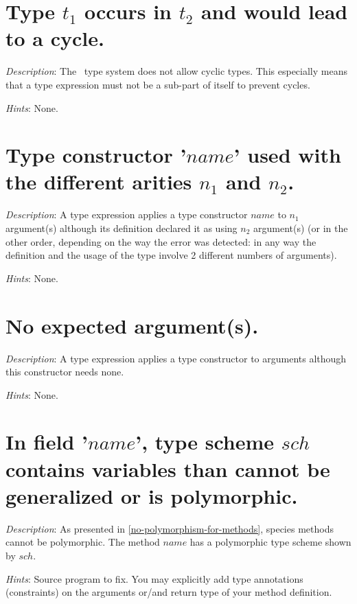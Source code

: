 \section*{Type $t_1$ occurs in $t_2$ and would lead to a cycle.}
{\em Description}: The \focal\ type system does not allow cyclic
types. This especially means that a type expression must not be a
sub-part of itself to prevent cycles.

{\em Hints}: None.



\section*{Type constructor '$name$' used with the different arities
  $n_1$ and $n_2$.}
{\em Description}: A type expression applies a type constructor $name$
to $n_1$ argument(s) although its definition declared it as using $n_2$
argument(s) (or in the other order, depending on the way the error was
detected: in any way the definition and the usage of the type involve
2 different numbers of arguments).

{\em Hints}: None.



\section*{No expected argument(s).}
{\em Description}: A type expression applies a type constructor to
arguments although this constructor needs none.

{\em Hints}: None.



\section*{In field '$name$', type scheme $sch$ contains variables than
  cannot be generalized or is polymorphic.}

{\em Description}: As presented in \ref{no-polymorphism-for-methods},
species methods cannot be polymorphic. The method $name$ has a
polymorphic type scheme shown by $sch$.

{\em Hints}: Source program to fix. You may explicitly add type
annotations (constraints) on the arguments or/and return type of your
method definition.




